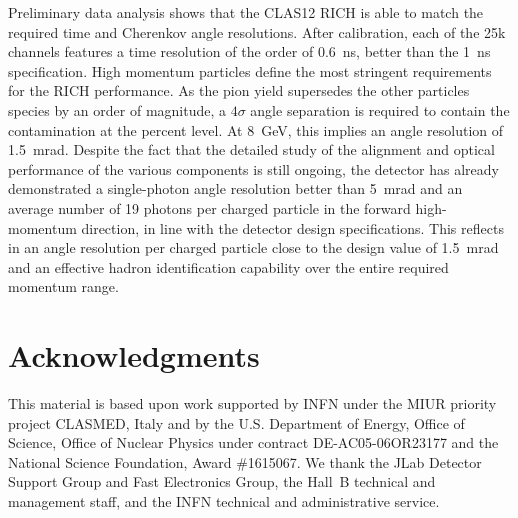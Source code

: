 \documentclass[5p,times,twocolumn]{elsarticle}
\begin{document}
Preliminary data analysis shows that the CLAS12 RICH is able to match the 
required time and Cherenkov angle resolutions. After calibration, each
of the 25k channels features a time resolution of the order of 0.6~ns,
better than the 1~ns specification. High momentum particles
define the most stringent requirements for the RICH performance. As the pion yield
supersedes the other particles species by an order of magnitude, a 
$4\sigma$ angle separation is required to contain the contamination 
at the percent level. At 8~GeV, this implies an angle resolution of 1.5~mrad.
Despite the fact that the detailed study of the alignment and optical performance of the various 
components is still ongoing, the detector has already demonstrated a single-photon 
angle resolution better than 5~mrad and an average number of 19 photons per charged particle
in the forward high-momentum direction, in line with the detector design specifications. This reflects in an angle resolution 
per charged particle close to the design value of 1.5~mrad and an effective hadron identification 
capability over the entire required momentum range.

\section{Acknowledgments}

This material is based upon work supported by INFN under the MIUR priority project CLASMED, Italy and by the
U.S. Department of Energy, Office of Science, Office of Nuclear Physics under contract DE-AC05-06OR23177 and
the National Science Foundation, Award \#1615067. We thank the JLab Detector Support Group and Fast Electronics
Group, the Hall~B technical and management staff, and the INFN technical and administrative service.
\end{document}
